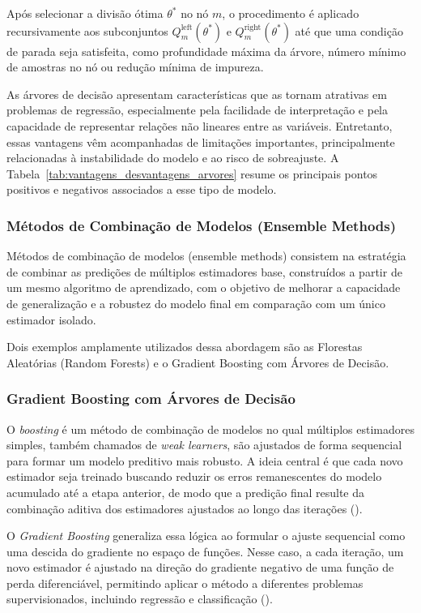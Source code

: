 Após selecionar a divisão ótima \(\theta^*\) no nó \(m\), o procedimento é aplicado recursivamente aos subconjuntos \(Q_m^{\mathrm{left}}(\theta^*)\) e \(Q_m^{\mathrm{right}}(\theta^*)\) até que uma condição de parada seja satisfeita, como profundidade máxima da árvore, número mínimo de amostras no nó ou redução mínima de impureza.

As árvores de decisão apresentam características que as tornam atrativas em problemas de regressão, especialmente pela facilidade de interpretação e pela capacidade de representar relações não lineares entre as variáveis. Entretanto, essas vantagens vêm acompanhadas de limitações importantes, principalmente relacionadas à instabilidade do modelo e ao risco de sobreajuste. A Tabela~\ref{tab:vantagens_desvantagens_arvores} resume os principais pontos positivos e negativos associados a esse tipo de modelo.
\subsubsection{Métodos de Combinação de Modelos (Ensemble Methods)}

Métodos de combinação de modelos (ensemble methods) consistem na estratégia de combinar as predições de múltiplos estimadores base, construídos a partir de um mesmo algoritmo de aprendizado, com o objetivo de melhorar a capacidade de generalização e a robustez do modelo final em comparação com um único estimador isolado.

Dois exemplos amplamente utilizados dessa abordagem são as Florestas Aleatórias (Random Forests) e o Gradient Boosting com Árvores de Decisão.

\subsubsection{Gradient Boosting com Árvores de Decisão}

O \textit{boosting} é um método de combinação de modelos no qual múltiplos estimadores simples, também chamados de \textit{weak learners}, são ajustados de forma sequencial para formar um modelo preditivo mais robusto. A ideia central é que cada novo estimador seja treinado buscando reduzir os erros remanescentes do modelo acumulado até a etapa anterior, de modo que a predição final resulte da combinação aditiva dos estimadores ajustados ao longo das iterações (\cite{Friedman2000}).

O \textit{Gradient Boosting} generaliza essa lógica ao formular o ajuste sequencial como uma descida do gradiente no espaço de funções. Nesse caso, a cada iteração, um novo estimador é ajustado na direção do gradiente negativo de uma função de perda diferenciável, permitindo aplicar o método a diferentes problemas supervisionados, incluindo regressão e classificação (\cite{Friedman2001}).



